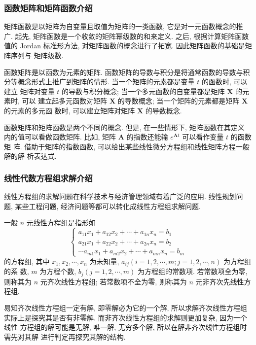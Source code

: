 \subsubsection{函数矩阵和矩阵函数介绍}

\par 矩阵函数是以矩阵为自变量且取值为矩阵的一类函数, 它是对一元函数概念的推
广. 起先, 矩阵函数是一个收敛的矩阵幂级数的和来定义. 之后, 根据计算矩阵函数值的
Jordan 标准形方法, 对矩阵函数的概念进行了拓宽. 因此矩阵函数的基础是矩阵序列与
矩阵级数.

\par 函数矩阵是以函数为元素的矩阵. 函数矩阵的导数与积分是将通常函数的导数与积
分等概念形式上推广到矩阵的情形. 当一个矩阵的元素都是变量 $t$ 的函数时, 可以建立
矩阵对变量 $t$ 的导数与积分概念; 当一个多元函数的自变量都是矩阵 $\bm{X}$ 的元素时, 可以
建立起多元函数对矩阵 $\bm{X}$ 的导数概念; 当一个矩阵的元素都是矩阵 $\bm{X}$ 的元素的多元函
数时, 可以建立矩阵对矩阵 $\bm{X}$ 的导数概念.

\par 函数矩阵和矩阵函数是两个不同的概念. 但是, 在一些情形下, 矩阵函数在其定义
内的值可以看做函数矩阵. 比如, 矩阵 $\bm{A}$ 的指数还能输 $e^{\bm{A}t}$ 可以看作变量 $t$ 的函数矩
阵. 借助于矩阵的指数函数, 可以给出某些线性微分方程组和线性矩阵方程一般解的解
析表达式.

\subsubsection{线性代数方程组求解介绍}

线性方程组的求解问题在科学技术与经济管理领域有着广泛的应用. 线性规划问
题, 某些工程问题, 经济问题等都可以转化成线性方程组求解问题.
\par 一般 $n$ 元线性方程组是指形如
$$
    \begin{cases}
        a_{11}x_1 + a_{12}x_2 + \cdots + a_{1n}x_n = b_1 \\
        a_{21}x_1 + a_{22}x_2 + \cdots + a_{2n}x_n = b_2 \\
        \cdots
        a_{m1}x_1 + a_{m2}x_2 + \cdots + a_{mn}x_n = b_m
    \end{cases}
$$
的方程组, 其中 $x_1, x_2, \cdots, x_n$ 为未知量, $a_{ij}(i = 1,2,\cdots,m;j=1,2,\cdots,n)$ 为方程组的系
数, $m$ 为方程个数, $b_j(j=1,2,\cdots,m)$ 为方程组的常数项. 若常数项全为零, 则称其为 $n$
元齐次线性方程组; 若常数项不全为零, 则称其为 $n$ 元非齐次先线性方程组.

\par 易知齐次线性方程组一定有解, 即零解必为它的一个解, 所以求解齐次线性方程组
实际上是探究其是否有非零解. 而非齐次线性方程组的求解则更加复杂, 因为一个线性
方程组的解可能是无解, 唯一解, 无穷多个解, 所以在解非齐次线性方程组时需先对其解
进行判定再探究其解的结构.

